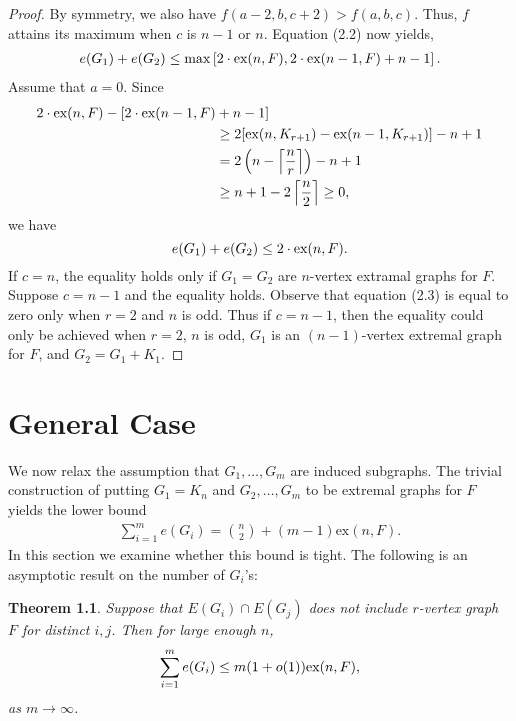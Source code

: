 \documentclass[12pt]{report}
\newtheorem{theorem}{Theorem}[chapter]
\begin{document}
\begin{proof}
  By symmetry, we also have $f(a - 2, b, c + 2) > f(a, b, c)$. Thus, $f$ attains its maximum when
  $c$ is $n - 1$ or $n$. Equation (2.2) now yields, 
  \begin{align*}
    e(G_1) + e(G_2) \leq \max\left[2 \cdot \textnormal{ex}(n, F), 2 \cdot \textnormal{ex}(n - 1, F) + n - 1\right].
  \end{align*}
  Assume that $a = 0$. Since
  \begin{align}
    2 \cdot \textnormal{ex}(n, F) - 
    [2 \cdot \textnormal{ex}(n - 1, F) &+ n - 1] \nonumber \\
    &\geq 2[\textnormal{ex}(n, K_{r + 1}) - \textnormal{ex}(n - 1, K_{r + 1})] - n + 1 \\
    &= 2\left(n - \left\lceil \frac{n}{r} \right\rceil\right) - n + 1 \nonumber  \\
    &\geq n + 1 - 2\left\lceil \frac{n}{2} \right\rceil \geq 0,  \nonumber 
  \end{align}
  we have
  \[
    e(G_1) + e(G_2) \leq 2 \cdot \textnormal{ex}(n, F).
  \]
  If $c = n$, the equality holds only if $G_1 = G_2$ are $n$-vertex extramal graphs for $F$. Suppose
  $c = n - 1$ and the equality holds. Observe that equation (2.3) is equal to zero only when $r = 2$
  and $n$ is odd. Thus if $c = n - 1$, then the equality could only be achieved when $r = 2$, $n$ is
  odd, $G_1$ is an $(n - 1)$-vertex extremal graph for $F$, and $G_2 = G_1 + K_1$.
\end{proof}

\chapter{General Case}

We now relax the assumption that $G_1, \dots, G_m$ are induced subgraphs. The trivial construction
of putting $G_1 = K_n$ and $G_2, \ldots, G_m$ to be extremal graphs for $F$ yields the lower bound
\begin{gather}
	\sum_{i = 1}^m e(G_i) = \binom{n}{2} + (m - 1)\text{ex}(n, F).
\end{gather}
In this section we examine whether this bound is tight. The following is an asymptotic result on the
number of $G_i$'s:

\begin{theorem}
	Suppose that $E(G_i) \cap E(G_j)$ does not include $r$-vertex graph $F$ for distinct $i, j$. Then
	for large enough $n$,
	\[
		\sum_{i = 1}^m e(G_i) \leq m(1 + o(1))\textnormal{ex}(n, F),
	\]
	as $m \to \infty$.
\end{theorem}
\end{document}
